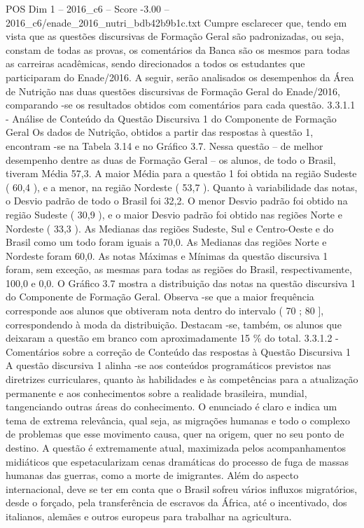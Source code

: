 \begin{textsample}{POS Dim 1 – 2016\_c6 – Score -3.00 – 2016\_c6/enade\_2016\_nutri\_bdb42b9b1c.txt}
Cumpre esclarecer que, tendo em vista que as questões discursivas de Formação Geral são padronizadas, ou seja, constam de todas as provas, os comentários da Banca são os mesmos para todas as carreiras acadêmicas, sendo direcionados a todos os estudantes que participaram do Enade/2016.
A seguir, serão analisados os desempenhos da Área de Nutrição nas duas questões discursivas de Formação Geral do Enade/2016, comparando -se os resultados obtidos com comentários para cada questão. 3.3.1.1 - Análise de Conteúdo da Questão Discursiva 1 do Componente de Formação Geral Os dados de Nutrição, obtidos a partir das respostas à questão 1, encontram -se na Tabela 3.14 e no Gráfico 3.7.
Nessa questão – de melhor desempenho dentre as duas de Formação Geral – os alunos, de todo o Brasil, tiveram Média 57,3.
A maior Média para a questão 1 foi obtida na região Sudeste ( 60,4 ), e a menor, na região Nordeste ( 53,7 ).
Quanto à variabilidade das notas, o Desvio padrão de todo o Brasil foi 32,2.
O menor Desvio padrão foi obtido na região Sudeste ( 30,9 ), e o maior Desvio padrão foi obtido nas regiões Norte e Nordeste ( 33,3 ).
As Medianas das regiões Sudeste, Sul e Centro-Oeste e do Brasil como um todo foram iguais a 70,0.
As Medianas das regiões Norte e Nordeste foram 60,0.
As notas Máximas e Mínimas da questão discursiva 1 foram, sem exceção, as mesmas para todas as regiões do Brasil, respectivamente, 100,0 e 0,0.
O Gráfico 3.7 mostra a distribuição das notas na questão discursiva 1 do Componente de Formação Geral.
Observa -se que a maior frequência corresponde aos alunos que obtiveram nota dentro do intervalo ( 70 ; 80 ], correspondendo à moda da distribuição.
Destacam -se, também, os alunos que deixaram a questão em branco com aproximadamente 15 \% do total. 3.3.1.2 - Comentários sobre a correção de Conteúdo das respostas à Questão Discursiva 1 A questão discursiva 1 alinha -se aos conteúdos programáticos previstos nas diretrizes curriculares, quanto às habilidades e às competências para a atualização permanente e aos conhecimentos sobre a realidade brasileira, mundial, tangenciando outras áreas do conhecimento.
O enunciado é claro e indica um tema de extrema relevância, qual seja, as migrações humanas e todo o complexo de problemas que esse movimento causa, quer na origem, quer no seu ponto de destino.
A questão é extremamente atual, maximizada pelos acompanhamentos midiáticos que espetacularizam cenas dramáticas do processo de fuga de massas humanas das guerras, como a morte de imigrantes.
Além do aspecto internacional, deve se ter em conta que o Brasil sofreu vários influxos migratórios, desde o forçado, pela transferência de escravos da África, até o incentivado, dos italianos, alemães e outros europeus para trabalhar na agricultura.

\end{textsample}

